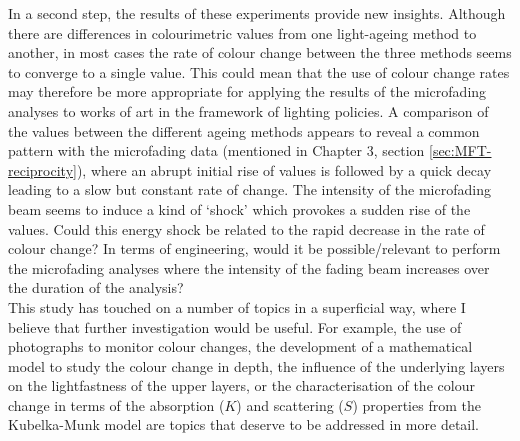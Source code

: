 In a second step, the results of these experiments provide new insights. Although there are differences in colourimetric values from one light-ageing method to another, in most cases the rate of colour change between the three methods seems to converge to a single value. This could mean that the use of colour change rates may therefore be more appropriate for applying the results of the microfading analyses to works of art in the framework of lighting policies. A comparison of the \dEOO values between the different ageing methods appears to reveal a common pattern with the microfading data (mentioned in Chapter 3, section \ref{sec:MFT-reciprocity}), where an abrupt initial rise of \dEOO values is followed by a quick decay leading to a slow but constant rate of change. The intensity of the microfading beam seems to induce a kind of ‘shock’ which provokes a sudden rise of the \dEOO values. Could this energy shock be related to the rapid decrease in the rate of colour change? In terms of engineering, would it be possible/relevant to perform the microfading analyses where the intensity of the fading beam increases over the duration of the analysis? \\

This study has touched on a number of topics in a superficial way, where I believe that further investigation would be useful. For example, the use of photographs to monitor colour changes, the development of a mathematical model to study the colour change in depth, the influence of the underlying layers on the lightfastness of the upper layers, or the characterisation of the colour change in terms of the absorption ($K$) and scattering ($S$) properties from the Kubelka-Munk model are topics that deserve to be addressed in more detail.
